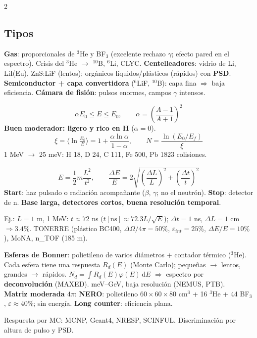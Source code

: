 \documentclass[10pt,a4paper]{article}
\newcommand{\imp}[1]{\textbf{\color{BrickRed}#1}}
\begin{document}
\begin{multicols}{2}
\subsection{Tipos}
\textbf{Gas}: proporcionales de $^3$He y BF$_3$ (excelente rechazo $\gamma$; efecto pared en el espectro). Crisis del $^3$He $\to$ $^{10}$B, $^6$Li, CLYC.
\textbf{Centelleadores}: vidrio de Li, LiI(Eu), ZnS:LiF (lentos); orgánicos líquidos/plásticos (rápidos) con \textbf{PSD}.
\textbf{Semiconductor + capa convertidora} ($^6$LiF, $^{10}$B): capa fina $\Rightarrow$ baja eficiencia.
\textbf{Cámara de fisión}: pulsos enormes, campos $\gamma$ intensos.
\begin{clave}[Moderación]
\[ \alpha E_0\le E\le E_0,\qquad \alpha=\left(\frac{A-1}{A+1}\right)^2 \]
\imp{Buen moderador: ligero y rico en H} ($\alpha=0$).
\[ \xi=\langle\ln\tfrac{E_0}{E}\rangle=1+\frac{\alpha\ln\alpha}{1-\alpha},\qquad N=\frac{\ln(E_0/E_f)}{\xi} \]
1 MeV $\to$ 25 meV: H 18, D 24, C 111, Fe 500, Pb 1823 colisiones.
\end{clave}
\columnbreak
\begin{clave}
\[ E=\frac12m\frac{L^2}{t^2},\qquad \frac{\Delta E}{E}=2\sqrt{\left(\frac{\Delta L}{L}\right)^2+\left(\frac{\Delta t}{t}\right)^2} \]
\textbf{Start}: haz pulsado o radiación acompañante ($\beta$, $\gamma$; no el neutrón). \textbf{Stop}: detector de n.
\imp{Base larga, detectores cortos, buena resolución temporal}.
\end{clave}
Ej.: $L=1$ m, 1 MeV: $t\approx72$ ns ($t[\mathrm{ns}]\approx72.3L/\sqrt{E}$); $\Delta t=1$ ns, $\Delta L=1$ cm $\Rightarrow3.4\%$. TONERRE (plástico BC400, $\Delta\Omega/4\pi=50\%$, $\varepsilon_{int}=25\%$, $\Delta E/E=10\%$), MoNA, n\_TOF (185 m).
\begin{clave}
\textbf{Esferas de Bonner}: polietileno de varios diámetros + contador térmico ($^3$He). Cada esfera tiene una respuesta $R_d(E)$ (Monte Carlo); pequeñas $\to$ lentos, grandes $\to$ rápidos.
$N_d=\int R_d(E)\varphi(E)\,\mathrm{d}E$ $\Rightarrow$ espectro por \imp{deconvolución} (MAXED). meV--GeV, baja resolución (NEMUS, PTB).\\
\textbf{Matriz moderada $4\pi$}: \textbf{NERO}: polietileno $60\times60\times80$ cm$^3$ + 16 $^3$He + 44 BF$_3$, $\varepsilon\approx40\%$; sin energía.
\textbf{Long counter}: eficiencia plana.
\end{clave}
Respuesta por MC: MCNP, Geant4, NRESP, SCINFUL. Discriminación por altura de pulso y PSD.
\end{multicols}
\newpage
\end{document}
